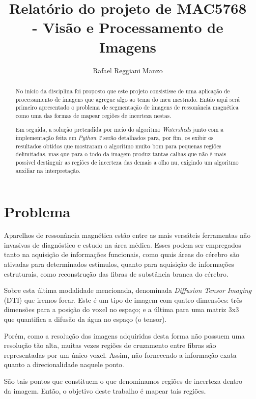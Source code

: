 \documentclass[a4paper,11pt]{report}
\title{Relatório do projeto de MAC5768 - Visão e Processamento de Imagens}
\author{Rafael Reggiani Manzo}
\begin{document}
\maketitle
\tableofcontents

\begin{abstract}
  No início da disciplina foi proposto que este projeto consistisse de uma aplicação de processamento de imagens que agregue algo ao tema do meu mestrado. Então aqui será primeiro apresentado o problema de segmentação de imagens de ressonância magnética como uma das formas de mapear regiões de incerteza nestas.

  Em seguida, a solução pretendida por meio do algoritmo \textit{Watersheds} junto com a implementação feita em \textit{Python 3} serão detalhados para, por fim, os exibir os resultados obtidos que mostraram o algoritmo muito bom para pequenas regiões delimitadas, mas que para o todo da imagem produz tantas calhas que não é mais possível destinguir as regiões de incerteza das demais a olho nu, exigindo um algoritmo auxiliar na interpretação.
\end{abstract}

\chapter{Problema}
Aparelhos de ressonância magnética estão entre as mais versáteis ferramentas não invasivas de diagnóstico e estudo na área médica. Esses podem ser empregados tanto na aquisição de informações funcionais, como quais áreas do cérebro são ativadas para determinados estímulos, quanto para aquisição de informações estruturais, como reconstrução das fibras de substância branca do cérebro.

Sobre esta última modalidade mencionada, denominada \textit{Diffusion Tensor Imaging} (DTI) que iremos focar. Este é um tipo de imagem com quatro dimensões: três dimensões para a posição do voxel no espaço; e a última para uma matriz $3$x$3$ que quantifica a difusão da água no espaço (o tensor).

Porém, como a resolução das imagens adquiridas desta forma não possuem uma resolução tão alta, muitas vezes regiões de cruzamento entre fibras são representadas por um único voxel. Assim, não fornecendo a informação exata quanto a direcionalidade naquele ponto.

São tais pontos que constituem o que denominamos regiões de incerteza dentro da imagem. Então, o objetivo deste trabalho é mapear tais regiões.
\end{document}
